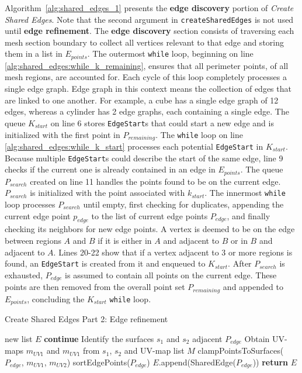 Algorithm~\ref{alg:shared_edges_1} presents the \textbf{edge discovery} portion of \textit{Create Shared Edges}.
Note that the second argument in \verb|createSharedEdges| is not used until \textbf{edge refinement}.
The \textbf{edge discovery} section consists of traversing each mesh section boundary to collect all vertices relevant to that edge and storing them in a list in $E_{points}$.
The outermost \verb|while| loop, beginning on line \ref{alg:shared_edges:while_k_remaining}, ensures that all perimeter points, of all mesh regions, are accounted for.
Each cycle of this loop completely processes a single edge graph.
Edge graph in this context means the collection of edges that are linked to one another.
For example, a cube has a single edge graph of 12 edges, whereas a cylinder has 2 edge graphs, each containing a single edge.
The queue $K_{start}$ on line 6 stores \verb|EdgeStart|s that could start a new edge and is initialized with the first point in $P_{remaining}$.
The \verb|while| loop on line \ref{alg:shared_edges:while_k_start} processes each potential \verb|EdgeStart| in $K_{start}$.
Because multiple \verb|EdgeStart|s could describe the start of the same edge, line 9 checks if the current one is already contained in an edge in $E_{points}$.
The queue $P_{search}$ created on line 11 handles the points found to be on the current edge.
$P_{search}$ is initialized with the point associated with $k_{start}$.
The innermost \verb|while| loop processes $P_{search}$ until empty, first checking for duplicates, appending the current edge point $p_{edge}$ to the list of current edge points $P_{edge}$, and finally checking its neighbors for new edge points.
A vertex is deemed to be on the edge between regions $A$ and $B$ if it is either in $A$ and adjacent to $B$ or in $B$ and adjacent to $A$.
Lines 20-22 show that if a vertex adjacent to 3 or more regions is found, an \verb|EdgeStart| is created from it and enqueued to $K_{start}$.
After $P_{search}$ is exhausted, $P_{edge}$ is assumed to contain all points on the current edge.
These points are then removed from the overall point set $P_{remaining}$ and appended to $E_{points}$, concluding the $K_{start}$ \verb|while| loop.

\begin{algorithm}[htb]
	\caption{Create Shared Edges Part 2: Edge refinement}\label{alg:shared_edges_2}
\begin{algorithmic}[1]
	\State new list $E$ 
	\label{alg:edge_refinement_for}
			\State \textbf{continue} 
		\EndIf
		\State Identify the surfaces $s_1$ and $s_2$ adjacent $P_{edge}$
		\State Obtain UV-maps $m_{UV1}$ and $m_{UV1}$ from $s_1$, $s_2$ and UV-map list $M$
		\State clampPointsToSurfaces($P_{edge}$, $m_{UV1}$, $m_{UV2}$)\label{alg:edge_refinement_clamp_pts}
		\State sortEdgePoints($P_{edge}$)
		\State $E$.append(SharedEdge($P_{edge}$))
	\EndFor
	\State \textbf{return} $E$
\EndFunction
\end{algorithmic}
\end{algorithm}

